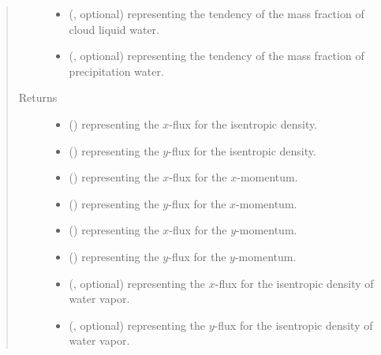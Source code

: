 \documentclass[letterpaper,10pt,english]{sphinxmanual}
\begin{document}
\begin{fulllineitems}
\begin{fulllineitems}
\begin{quote}
\begin{description}
\begin{itemize}
\item {} 
 (, optional) \textendash{}  representing the tendency of the mass fraction of cloud liquid water.

\item {} 
 (, optional) \textendash{}  representing the tendency of the mass fraction of precipitation water.

\end{itemize}

\item[{Returns}] \leavevmode
\begin{itemize}
\item {} 
 () \textendash{}  representing the \(x\)-flux for the isentropic density.

\item {} 
 () \textendash{}  representing the \(y\)-flux for the isentropic density.

\item {} 
 () \textendash{}  representing the \(x\)-flux for the \(x\)-momentum.

\item {} 
 () \textendash{}  representing the \(y\)-flux for the \(x\)-momentum.

\item {} 
 () \textendash{}  representing the \(x\)-flux for the \(y\)-momentum.

\item {} 
 () \textendash{}  representing the \(y\)-flux for the \(y\)-momentum.

\item {} 
 (, optional) \textendash{}  representing the \(x\)-flux for the isentropic density of water vapor.

\item {} 
 (, optional) \textendash{}  representing the \(y\)-flux for the isentropic density of water vapor.


\end{itemize}
\end{description}
\end{quote}
\end{fulllineitems}
\end{fulllineitems}
\end{document}
